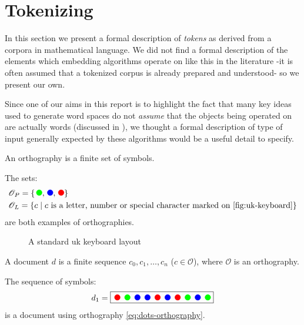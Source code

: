 \section{Tokenizing}
In this section we present a formal description of \emph{tokens} as derived from a corpora in mathematical language. We did not find a formal description of the elements which embedding algorithms operate on like this in the literature -it is often assumed that a tokenized corpus is already prepared and understood- so we present our own.

Since one of our aims in this report is to highlight the fact that many key ideas used to generate word spaces do not \emph{assume} that the objects being operated on are actually words (discussed in ), we thought a formal description of type of input generally expected by these algorithms would be a useful detail to specify.
\begin{definition}[Orthography]\label{def:orthography}
  An orthography is a finite set of symbols.
\end{definition}

\begin{example}\label{ex:orthographies}
  The sets:
  \begin{align}
    &\mathscr{O}_P=\{\mycirc[green], \mycirc[blue], \mycirc[red]\}\label{eq:dots-orthography}\\
    &\mathscr{O}_L=\{c\mid\text{$c$ is a letter, number or special character marked on \autoref{fig:uk-keyboard}}\}\label{eq:keyboard-orthography}
  \end{align}
  are both examples of orthographies.
\end{example}
\vspace{6pt}

\begin{figure}[ht]
 \centering
 
 \caption{A standard uk keyboard layout}
 \label{fig:uk-keyboard}
\end{figure}

\begin{definition}[Document]
  A document $d$ is a finite sequence $c_0,c_1,\dots,c_n$ ($c\in\mathscr{O}$), where $\mathscr{O}$ is an orthography.
\end{definition}

\begin{example}\label{ex:doc-plato}
  The sequence of symbols:
  \[
    d_1=\fbox{\mycirc[red] \mycirc[green] \mycirc[blue] \mycirc[blue] \mycirc[red] \mycirc[blue] \mycirc[red] \mycirc[green] \mycirc[blue] \mycirc[green]}\label{eq:dots-document}
  \]
  is a document using orthography \eqref{eq:dots-orthography}.
\end{example}

